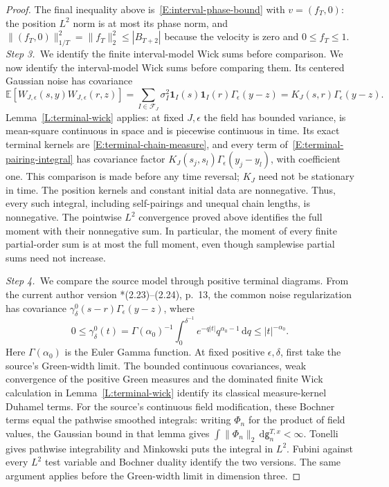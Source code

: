 \documentclass[12pt,oneside,openany]{book}
\numberwithin{equation}{section}
\theoremstyle{nogostyle}
\theoremstyle{definition}
\newcommand{\E}{\mathbb{E}}
\newcommand{\ud}{\,\mathrm{d}}
\begin{document}
\begin{proof}
  The final inequality above is~\eqref{E:interval-phase-bound} with
  $v=(f_T,0)$: the position $L^2$ norm is at most its phase norm, and
  $\|(f_T,0)\|_{1/T}^2=\|f_T\|_2^2\le|B_{T+2}|$ because the velocity is zero
  and $0\le f_T\le1$.
  \medskip
  \noindent\textit{Step 3.~}We identify the finite interval-model Wick sums
  before comparison.
  We now identify the interval-model Wick sums before comparing them. Its
  centered Gaussian noise has covariance
  \[
    \E[W_{J,\epsilon}(s,y)W_{J,\epsilon}(r,z)]
    =\sum_{I\in\mathcal{F}_J}\sigma_I^2
    \mathbf1_I(s)\mathbf1_I(r)\Gamma_\epsilon(y-z)
    =K_J(s,r)\Gamma_\epsilon(y-z).
  \]
  Lemma~\ref{L:terminal-wick} applies: at fixed $J,\epsilon$ the field has
  bounded variance, is mean-square continuous in space and is piecewise
  continuous in time. Its exact terminal kernels are
  \eqref{E:terminal-chain-measure}, and every term
  of~\eqref{E:terminal-pairing-integral} has covariance factor
  $K_J(s_j,s_l)\Gamma_\epsilon(y_j-y_l)$, with coefficient one. This comparison
  is made before any time reversal; $K_J$ need not be stationary in time. The
  position kernels and constant initial data are nonnegative. Thus, every such
  integral, including self-pairings and unequal chain lengths, is nonnegative.
  The pointwise $L^2$ convergence proved above identifies the full moment with
  their nonnegative sum. In particular, the moment of every finite partial-order
  sum is at most the full moment, even though samplewise partial sums need not
  increase.


  \medskip
  \noindent\textit{Step 4.~}We compare the source model through positive
  terminal diagrams.
  From the current author version
  \cite{chen:author2026:time-dependency}*{(2.23)--(2.24), p.~13}, the common
  noise regularization has covariance
  $\gamma_\delta^0(s-r)\Gamma_\epsilon(y-z)$, where
  \[
    0\le\gamma_\delta^0(t)
    =\Gamma(\alpha_0)^{-1}\int_0^{\delta^{-1}}
    e^{-q|t|}q^{\alpha_0-1}\ud q
    \le |t|^{-\alpha_0}.
  \]
  Here $\Gamma(\alpha_0)$ is the Euler Gamma function. At fixed positive
  $\epsilon,\delta$, first take the source's Green-width limit. The bounded
  continuous covariances, weak convergence of the positive Green measures and
  the dominated finite Wick calculation in Lemma~\ref{L:terminal-wick} identify
  its classical measure-kernel Duhamel terms. For the source's continuous field
  modification, these Bochner terms equal the pathwise smoothed integrals:
  writing $\Phi_n$ for the product of field values, the Gaussian bound in that
  lemma gives $\int\|\Phi_n\|_2\ud\mathsf{g}_n^{T,x} < \infty$. Tonelli gives
  pathwise integrability and Minkowski puts the integral in $L^2$. Fubini
  against every $L^2$ test variable and Bochner duality identify the two
  versions. The same argument applies before the Green-width limit in dimension
  three.


\end{proof}
\end{document}
